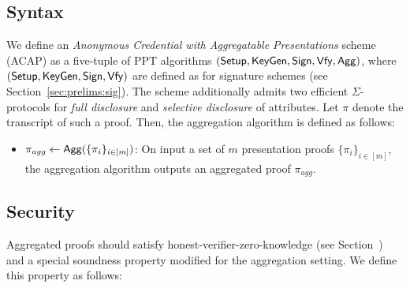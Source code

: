 \subsection{Syntax}
We define an \emph{Anonymous Credential with Aggregatable Presentations} scheme (ACAP) as a five-tuple of PPT algorithms $(\mathsf{Setup}, \mathsf{KeyGen}, \mathsf{Sign}, \mathsf{Vfy}, \mathsf{Agg})$, where $(\mathsf{Setup}, \mathsf{KeyGen}, \mathsf{Sign}, \mathsf{Vfy})$ are defined as for signature schemes (see Section~\ref{sec:prelims:sig}). The scheme additionally admits two efficient $\Sigma$-protocols for \textit{full disclosure} and \textit{selective disclosure} of attributes. Let $\pi$ denote the transcript of such a proof. Then, the aggregation algorithm is defined as follows:
\begin{itemize}
    \item $\pi_{agg} \gets \mathsf{Agg}(\{\pi_i\}_{i\in[m]})$: On input a set of $m$ presentation proofs $\{\pi_i\}_{i\in[m]}$, the aggregation algorithm outputs an aggregated proof $\pi_{agg}$.
\end{itemize}

\subsection{Security}
Aggregated proofs should satisfy honest-verifier-zero-knowledge (see Section~\missingcite) and a special soundness property modified for the aggregation setting. We define this property as follows: 
